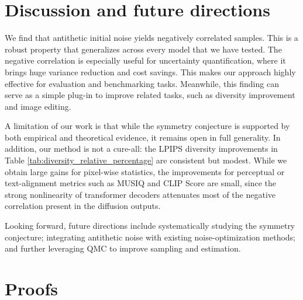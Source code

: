 \documentclass[12pt]{article}
\newcommand{\0}{\mathbf{0}}
\begin{document}
\section{Discussion and future directions}\label{sec:conclusion}
We find that antithetic initial noise yields negatively correlated samples. This is a robust property that generalizes across every model that we have tested. The negative correlation is especially useful for uncertainty quantification, where it brings huge variance reduction and cost savings. This makes our approach highly effective for evaluation and benchmarking tasks. Meanwhile, this finding can serve as a simple plug-in to improve related tasks, such as diversity improvement and image editing. 

A limitation of our work is that while the symmetry conjecture is supported by both empirical and theoretical evidence, it remains open in full generality.  In addition, our method is not a cure-all: the LPIPS diversity improvements in Table \ref{tab:diversity_relative_percentage} are consistent but modest. While we obtain large gains for pixel-wise statistics, the improvements for perceptual or text-alignment metrics such as MUSIQ and CLIP Score are small, since the strong nonlinearity of transformer decoders attenuates most of the negative correlation present in the diffusion outputs.

Looking forward, future directions include systematically studying the symmetry conjecture; integrating antithetic noise with existing noise-optimization methods; and further leveraging QMC to improve sampling and estimation.



 






\appendix
 
\section{Proofs}\label{sec:proof}
\end{document}
